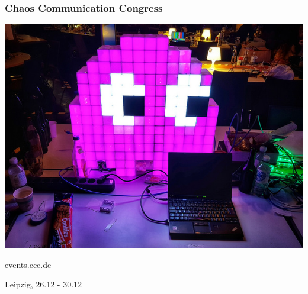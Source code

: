 \documentclass[12pt]{beamer}
\begin{document}
	\begin{frame}
			\frametitle{Chaos Communication Congress}
			\begin{center}
				\includegraphics[height=0.7\textheight]{img//congress-ghost.jpg}
				\vspace{10pt}		
			
				events.ccc.de

				Leipzig, 26.12 - 30.12				
			\end{center}
	\end{frame}	
		
\end{document}
